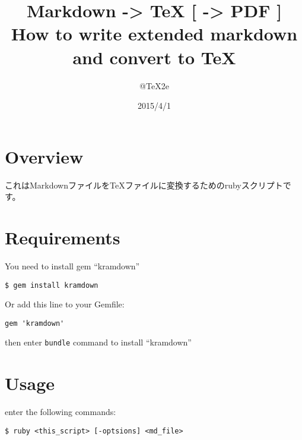\documentclass[a4j, titlepage]{jarticle}
\title{ \Huge Markdown -\textgreater{} TeX [ -\textgreater{} PDF ] \\{\LARGE How to write extended markdown and convert to TeX} }
\author{ \Large @TeX2e }
\date{ \Large 2015/4/1 }
\renewcommand{\lstlistingname}{リスト}
\begin{document}
\maketitle
\thispagestyle{empty}
\newpage
\setcounter{page}{1}

% 

\section{Overview}

これはMarkdownファイルをTeXファイルに変換するためのrubyスクリプトです。

\section{Requirements}

You need to install gem ``kramdown''

\begin{screen}
\begin{verbatim}
$ gem install kramdown
\end{verbatim}
\end{screen}

Or add this line to your Gemfile:

\begin{screen}
\begin{verbatim}
gem 'kramdown'
\end{verbatim}
\end{screen}

then enter {\tt bundle} command to install ``kramdown''

\section{Usage}

enter the following commands:

\begin{screen}
\begin{verbatim}
$ ruby <this_script> [-optsions] <md_file>
\end{verbatim}
\end{screen}
\end{document}
